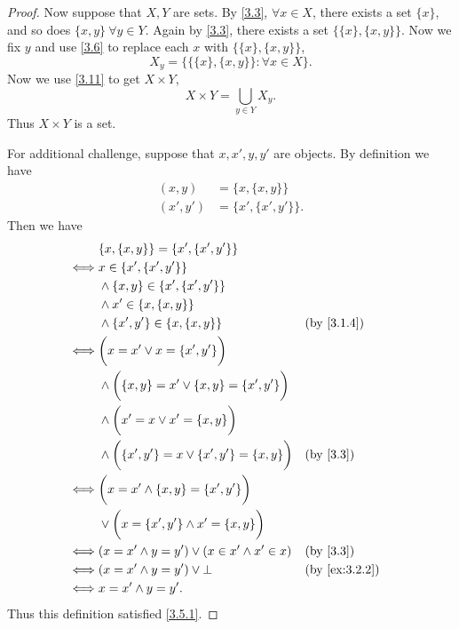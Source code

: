 \begin{proof}
  Now suppose that \(X, Y\) are sets.
  By \cref{3.3}, \(\forall x \in X\), there exists a set \(\{x\}\), and so does \(\{x, y\} \ \forall y \in Y\).
  Again by \cref{3.3}, there exists a set \(\{\{x\}, \{x, y\}\}\).
  Now we fix \(y\) and use \cref{3.6} to replace each \(x\) with \(\{\{x\}, \{x, y\}\}\),
  \[
    X_y = \{\{\{x\}, \{x, y\}\} : \forall x \in X\}.
  \]
  Now we use \cref{3.11} to get \(X \times Y\),
  \[
    X \times Y = \bigcup_{y \in Y} X_y.
  \]
  Thus \(X \times Y\) is a set.

  For additional challenge, suppose that \(x, x', y, y'\) are objects.
  By definition we have
  \begin{align*}
    (x, y)   & = \{x, \{x, y\}\}     \\
    (x', y') & = \{x', \{x', y'\}\}.
  \end{align*}
  Then we have
  \begin{align*}
         & \{x, \{x, y\}\} = \{x', \{x', y'\}\}                                                         \\
    \iff & x \in \{x', \{x', y'\}\}                                                                     \\
         & \land \{x, y\} \in \{x', \{x', y'\}\}                                                        \\
         & \land x' \in \{x, \{x, y\}\}                                                                 \\
         & \land \{x', y'\} \in \{x, \{x, y\}\}                        &  & \text{(by \cref{3.1.4})}    \\
    \iff & \bigg(x = x' \lor x = \{x', y'\}\bigg)                                                       \\
         & \land \bigg(\{x, y\} = x' \lor \{x, y\} = \{x', y'\}\bigg)                                   \\
         & \land \bigg(x' = x \lor x' = \{x, y\}\bigg)                                                  \\
         & \land \bigg(\{x', y'\} = x \lor \{x', y'\} = \{x, y\}\bigg) &  & \text{(by \cref{3.3})}      \\
    \iff & \bigg(x = x' \land \{x, y\} = \{x', y'\}\bigg)                                               \\
         & \lor \bigg(x = \{x', y'\} \land x' = \{x, y\}\bigg)                                          \\
    \iff & (x = x' \land y = y') \lor (x \in x' \land x' \in x)        &  & \text{(by \cref{3.3})}      \\
    \iff & (x = x' \land y = y') \lor \bot                             &  & \text{(by \cref{ex:3.2.2})} \\
    \iff & x = x' \land y = y'.
  \end{align*}
  Thus this definition satisfied \cref{3.5.1}.
\end{proof}

